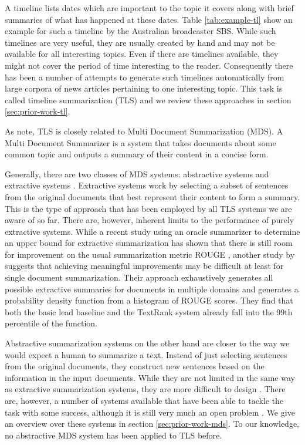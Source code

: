 \documentclass[a4paper,BCOR=10mm]{report}
\numberwithin{lemma}{chapter}
\numberwithin{definition}{chapter}
\begin{document}
A timeline lists dates which are important to the topic it covers along with brief summaries of what has happened at these dates. Table \ref{tab:example-tl} show an example for such a timeline by the Australian broadcaster SBS.
While such timelines are very useful, they are usually created by hand and may not be available for all interesting topics. Even if there are timelines available, they might not cover the period of time interesting to the reader.
Consequently there has been a number of attempts to generate such timelines automatically from large corpora of news articles pertaining to one interesting topic. This task is called timeline summarization (TLS) and we review these approaches in section \ref{sec:prior-work-tl}.

As \citet{markert} note, TLS is closely related to Multi Document Summarization (MDS).
A Multi Document Summarizer is a system that takes documents about some common topic and outputs a summary of their content in a concise form.

Generally, there are two classes of MDS systems: abstractive systems and extractive systems \citep{a-brief-survey}. Extractive systems work by selecting a subset of sentences from the original documents that best represent their content to form a summary. This is the type of approach that has been employed by all TLS systems we are aware of so far.
There are, however, inherent limits to the performance of purely extractive systems. While a recent study \citep{hirao+nishino} using an oracle summarizer to determine an upper bound for extractive summarization has shown that there is still room for improvement on the usual summarization metric ROUGE \citep{rouge}, another study by \citet{ceylan+mihalcea} suggests that achieving meaningful improvements may be difficult at least for single document summarization. Their approach exhaustively generates all possible extractive summaries for documents in multiple domains and generates a probability density function from a histogram of ROUGE scores. They find that both the basic lead baseline and the TextRank system \citep{textrank} already fall into the 99th percentile of the function.

Abstractive summarization systems on the other hand are closer to the way we would expect a human to summarize a text. Instead of just selecting sentences from the original documents, they construct new sentences based on the information in the input documents. While they are not limited in the same way as extractive summarization systems, they are more difficult to design \citep{recent-advances, a-brief-survey}.
There are, however, a number of systems available that have been able to tackle the task with some success, although it is still very much an open problem \citep{recent-advances}. We give an overview over these systems in section \ref{sec:prior-work-mds}.
To our knowledge, no abstractive MDS system has been applied to TLS before.
\end{document}

